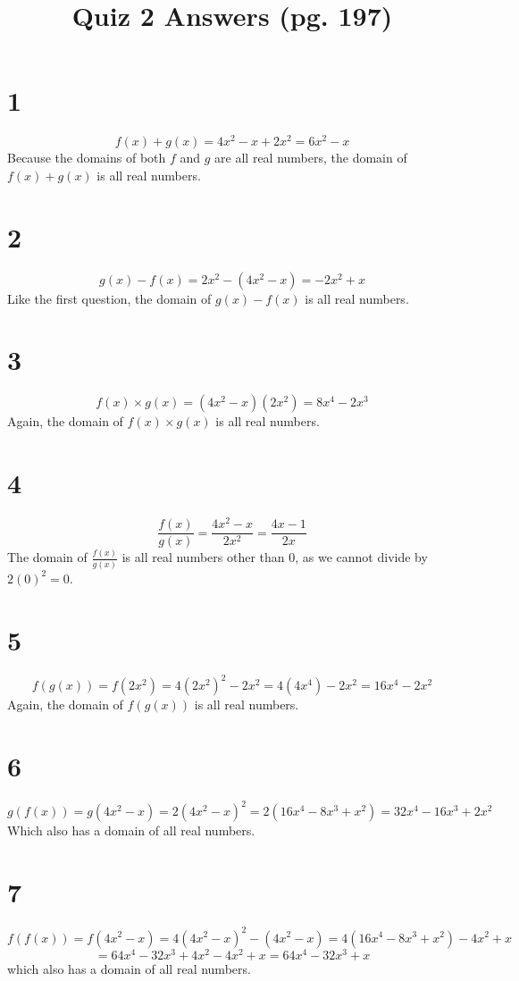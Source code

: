 \documentclass{article}
\title{Quiz 2 Answers (pg. 197)}
\theoremstyle{definition}
\begin{document}
\maketitle

\section*{1}
\[ f(x)+g(x)=4x^2-x+2x^2=6x^2-x \]
Because the domains of both $f$ and $g$ are all real numbers, the domain of $f(x)+g(x)$ is all real numbers.

\section*{2}
\[ g(x)-f(x)=2x^2-(4x^2-x)=-2x^2+x \]
Like the first question, the domain of $g(x)-f(x)$ is all real numbers.

\section*{3}
\[ f(x)\times g(x)=(4x^2-x)(2x^2)=8x^4-2x^3 \]
Again, the domain of $f(x)\times g(x)$ is all real numbers.

\section*{4}
\[ \frac{f(x)}{g(x)}=\frac{4x^2-x}{2x^2}=\frac{4x-1}{2x} \]
The domain of $\frac{f(x)}{g(x)}$ is all real numbers other than 0, as we cannot divide by $2(0)^2=0$.

\section*{5}
\[ f(g(x))=f(2x^2)=4(2x^2)^2-2x^2=4(4x^4)-2x^2=16x^4-2x^2 \]
Again, the domain of $f(g(x))$ is all real numbers.

\section*{6}
\[ g(f(x))=g(4x^2-x)=2(4x^2-x)^2=2(16x^4-8x^3+x^2)=32x^4-16x^3+2x^2 \]
Which also has a domain of all real numbers.

\section*{7}
\[ f(f(x))=f(4x^2-x)=4(4x^2-x)^2-(4x^2-x)=4(16x^4-8x^3+x^2)-4x^2+x \]
\[ =64x^4-32x^3+4x^2-4x^2+x=64x^4-32x^3+x \]
which also has a domain of all real numbers.
\end{document}
